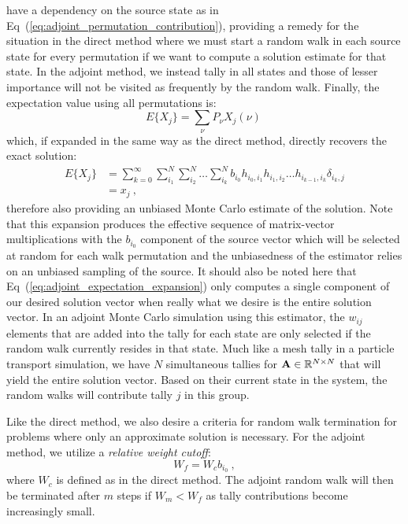 have a dependency on the source state as in
Eq~(\ref{eq:adjoint_permutation_contribution}), providing a remedy for
the situation in the direct method where we must start a random walk
in each source state for every permutation if we want to compute a
solution estimate for that state. In the adjoint method, we instead
tally in all states and those of lesser importance will not be visited
as frequently by the random walk. Finally, the expectation value using
all permutations is:
\begin{equation}
  E\{X_j\} = \sum_{\nu} P_{\nu} X_{j}(\nu)\:
  \label{eq:adjoint_expectation_value}
\end{equation}
which, if expanded in the same way as the direct method, directly
recovers the exact solution:
\begin{equation}
  \begin{split}
    E\{X_j\} &=\sum_{k=0}^{\infty}\sum_{i_1}^{N}\sum_{i_2}^{N}\ldots
    \sum_{i_k}^{N} b_{i_0} h_{i_0,i_1}h_{i_1,i_2}\ldots
    h_{i_{k-1},i_k} \delta_{i_k,j} \\ &= x_{j}\:,
  \end{split}
  \label{eq:adjoint_expectation_expansion}
\end{equation}
therefore also providing an unbiased Monte Carlo estimate of the
solution. Note that this expansion produces the effective sequence of
matrix-vector multiplications with the $b_{i_0}$ component of the
source vector which will be selected at random for each walk
permutation and the unbiasedness of the estimator relies on an
unbiased sampling of the source. It should also be noted here that
Eq~(\ref{eq:adjoint_expectation_expansion}) only computes a single
component of our desired solution vector when really what we desire is
the entire solution vector. In an adjoint Monte Carlo simulation using
this estimator, the $w_{ij}$ elements that are added into the tally
for each state are only selected if the random walk currently resides
in that state. Much like a mesh tally in a particle transport
simulation, we have $N$ simultaneous tallies for $\mathbf{A} \in
\mathbb{R}^{N \times N}$ that will yield the entire solution
vector. Based on their current state in the system, the random walks
will contribute tally $j$ in this group.

Like the direct method, we also desire a criteria for random walk
termination for problems where only an approximate solution is
necessary. For the adjoint method, we utilize a \textit{relative
  weight cutoff}:
\begin{equation}
  W_f = W_c b_{i_0}\:,
  \label{eq:relative_weight_cutoff}
\end{equation}
where $W_c$ is defined as in the direct method. The adjoint random
walk will then be terminated after $m$ steps if $W_m < W_f$ as tally
contributions become increasingly small.

